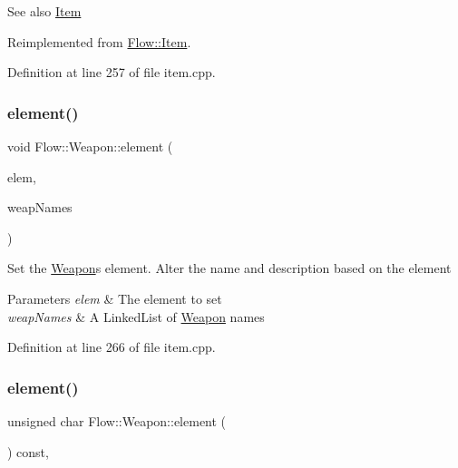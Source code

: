 \begin{DoxySeeAlso}{See also}
\hyperlink{class_flow_1_1_item}{Item} 
\end{DoxySeeAlso}


Reimplemented from \hyperlink{class_flow_1_1_item_a9a9f3132cecb67d6104668100f00cd47}{Flow\+::\+Item}.



Definition at line 257 of file item.\+cpp.

\hypertarget{class_flow_1_1_weapon_a37b7081fb155f49bf6af4ab4fdbf5d85}{}\label{class_flow_1_1_weapon_a37b7081fb155f49bf6af4ab4fdbf5d85} 
\subsubsection{\texorpdfstring{element()}{element()}\hspace{0.1cm}{\footnotesize\ttfamily [2/3]}}
{\footnotesize\ttfamily void Flow\+::\+Weapon\+::element (\begin{DoxyParamCaption}\item[{unsigned char}]{elem,  }\item[{const \hyperlink{class_collections_1_1_linked_list}{Collections\+::\+Linked\+List}$<$ std\+::string $>$ \&}]{weap\+Names }\end{DoxyParamCaption})}

Set the \hyperlink{class_flow_1_1_weapon}{Weapon}\textquotesingle{}s element. Alter the name and description based on the element 
\begin{DoxyParams}{Parameters}
{\em elem} & The element to set \\
\hline
{\em weap\+Names} & A Linked\+List of \hyperlink{class_flow_1_1_weapon}{Weapon} names \\
\hline
\end{DoxyParams}


Definition at line 266 of file item.\+cpp.

\hypertarget{class_flow_1_1_weapon_a7bf5d4c7fe9132615ae906c1992e3e53}{}\label{class_flow_1_1_weapon_a7bf5d4c7fe9132615ae906c1992e3e53} 
\subsubsection{\texorpdfstring{element()}{element()}\hspace{0.1cm}{\footnotesize\ttfamily [3/3]}}
{\footnotesize\ttfamily unsigned char Flow\+::\+Weapon\+::element (\begin{DoxyParamCaption}{ }\end{DoxyParamCaption}) const\hspace{0.3cm}{\ttfamily [override]}, {\ttfamily [virtual]}}

